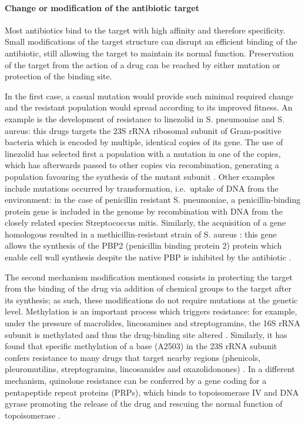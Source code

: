 \paragraph{Change or modification of the antibiotic target}
Most antibiotics bind to the target with high affinity and therefore specificity. Small modifications of the target structure can disrupt an efficient binding of the antibiotic, still allowing the target to maintain its normal function. Preservation of the target from the action of a drug can be reached by either mutation or protection of the binding site.

In the first case, a casual mutation would provide such minimal required change and the resistant population would spread according to its improved fitness.
%
An example is the development of resistance to linezolid in S. pneumoniae and S. aureus: this drugs targets the 23S rRNA ribosomal subunit of Gram-positive bacteria which is encoded by multiple, identical copies of its gene. The use of linezolid has selected first a population with a mutation in one of the copies, which has afterwards passed to other copies via recombination, generating a population favouring the synthesis of the mutant subunit \cite{Billal2011,Gao2010}.
%
Other examples include mutations occurred by transformation, i.e.\ uptake of DNA from the environment: in the case of penicillin resistant S. pneumoniae, a penicillin-binding protein gene is included in the genome by recombination with DNA from the closely related species Streptococcus mitis. Similarly, the acquisition of a gene homologous resulted in a methicillin-resistant strain of S. aureus \cite{Shore2011}: this gene allows the synthesis of the PBP2 (penicillin binding protein 2) protein which enable cell wall synthesis despite the native PBP is inhibited by the antibiotic \cite{Katayama2000}.

The second mechanism modification mentioned consists in protecting the target from the binding of the drug via addition of chemical groups to the target after its synthesis; as such, these modifications do not require mutations at the genetic level.
%
Methylation is an important process which triggers resistance: for example, under the pressure of macrolides, lincosamines and streptogramins, the 16S rRNA subunit is methylated and thus the drug-binding site altered \cite{Kumar2014}. Similarly, it has found that specific methylation of a base (A2503) in the 23S rRNA subunit confers resistance to many drugs that target nearby regions (phenicols, pleuromutilins, streptogramins, lincosamides and oxazolidonones) \cite{Long2006}.
%
In a different mechanism, quinolone resistance can be conferred by a gene coding for a pentapeptide repeat proteins (PRPs), which binds to topoisomerase IV and DNA gyrase promoting the release of the drug and rescuing the normal function of topoisomerase \cite{Vetting2011}.


